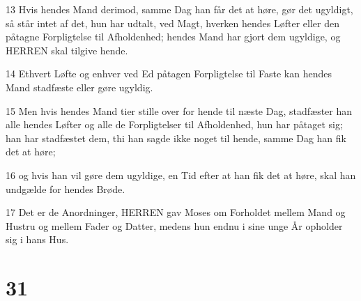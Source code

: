 \par 13 Hvis hendes Mand derimod, samme Dag han får det at høre, gør det ugyldigt, så står intet af det, hun har udtalt, ved Magt, hverken hendes Løfter eller den påtagne Forpligtelse til Afholdenhed; hendes Mand har gjort dem ugyldige, og HERREN skal tilgive hende.
\par 14 Ethvert Løfte og enhver ved Ed påtagen Forpligtelse til Faste kan hendes Mand stadfæste eller gøre ugyldig.
\par 15 Men hvis hendes Mand tier stille over for hende til næste Dag, stadfæster han alle hendes Løfter og alle de Forpligtelser til Afholdenhed, hun har påtaget sig; han har stadfæstet dem, thi han sagde ikke noget til hende, samme Dag han fik det at høre;
\par 16 og hvis han vil gøre dem ugyldige, en Tid efter at han fik det at høre, skal han undgælde for hendes Brøde.
\par 17 Det er de Anordninger, HERREN gav Moses om Forholdet mellem Mand og Hustru og mellem Fader og Datter, medens hun endnu i sine unge År opholder sig i hans Hus.

\chapter{31}

